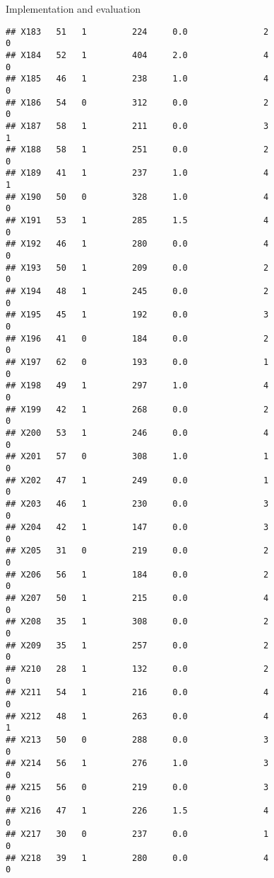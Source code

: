 \documentclass[
  ignorenonframetext,
]{beamer}
\begin{document}
\begin{frame}[fragile]{Implementation and evaluation}
\begin{verbatim}
## X183   51   1         224     0.0               2                   0
## X184   52   1         404     2.0               4                   0
## X185   46   1         238     1.0               4                   0
## X186   54   0         312     0.0               2                   0
## X187   58   1         211     0.0               3                   1
## X188   58   1         251     0.0               2                   0
## X189   41   1         237     1.0               4                   1
## X190   50   0         328     1.0               4                   0
## X191   53   1         285     1.5               4                   0
## X192   46   1         280     0.0               4                   0
## X193   50   1         209     0.0               2                   0
## X194   48   1         245     0.0               2                   0
## X195   45   1         192     0.0               3                   0
## X196   41   0         184     0.0               2                   0
## X197   62   0         193     0.0               1                   0
## X198   49   1         297     1.0               4                   0
## X199   42   1         268     0.0               2                   0
## X200   53   1         246     0.0               4                   0
## X201   57   0         308     1.0               1                   0
## X202   47   1         249     0.0               1                   0
## X203   46   1         230     0.0               3                   0
## X204   42   1         147     0.0               3                   0
## X205   31   0         219     0.0               2                   0
## X206   56   1         184     0.0               2                   0
## X207   50   1         215     0.0               4                   0
## X208   35   1         308     0.0               2                   0
## X209   35   1         257     0.0               2                   0
## X210   28   1         132     0.0               2                   0
## X211   54   1         216     0.0               4                   0
## X212   48   1         263     0.0               4                   1
## X213   50   0         288     0.0               3                   0
## X214   56   1         276     1.0               3                   0
## X215   56   0         219     0.0               3                   0
## X216   47   1         226     1.5               4                   0
## X217   30   0         237     0.0               1                   0
## X218   39   1         280     0.0               4                   0

\end{verbatim}
\end{frame}
\end{document}
